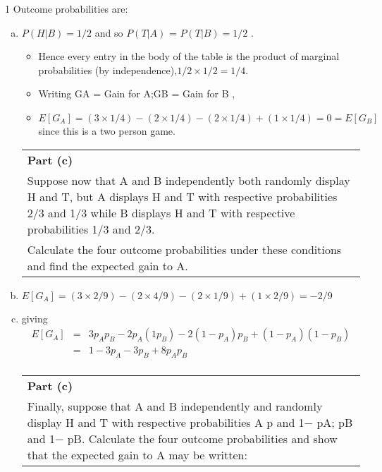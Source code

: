 \documentclass[a4paper,12pt]{article}
\begin{document}
1 Outcome probabilities are:
\begin{enumerate}[(a)]
 \item  $P(H|B) = 1/2$ and so $P(T|A)$ = $P(T|B) = 1/2$ .
\begin{itemize}
\item Hence every entry in the body of the table is the product of marginal probabilities (by
independence),$1/2 \times 1/2 = 1/4$.
\item Writing GA = Gain for A;GB = Gain for B ,
\item $E[G_A] = (3 \times 1/4) - (2 \times 1/4) - (2 \times 1/4) + (1 \times 1/4) = 0 = E[G_B]$
since this is a two person game.
\end{itemize}
\newpage
 
  \begin{table}[ht!]
  \centering
  \begin{tabular}{|p{15cm}|}
  \hline  
  \noindent \textbf{Part (c)} \\
Suppose now that A and B independently both randomly display H and T, but A displays H and T with respective probabilities 2/3 and 1/3 while B displays H and T with respective probabilities 1/3 and 2/3. \\ \smallskip

Calculate the four outcome probabilities under these conditions and find the expected gain to A. 
 \\ \hline 
   \end{tabular}
 \end{table}
 

\item $E[G_A] = (3 \times 2/9) - (2 \times 4/9) - (2 \times 1/9) + (1 \times 2/9) = -2/9$
\item giving 
\begin{eqnarray*}
E[G_A] &=& 3p_Ap_B - 2p_A(1  p_B) - 2(1 - p_A)p_B + (1 - p_A)(1 - p_B)\\ &=& 1 - 3p_A -
3p_B + 8p_Ap_B\\
\end{eqnarray*}
\newpage
\begin{table}[ht!]
 \centering
  \begin{tabular}{|p{15cm}|}
  \hline  
  \noindent \textbf{Part (c)} \\
Finally, suppose that A and B independently and randomly display H and T with respective probabilities A p and 1− pA;  pB and 1− pB.  Calculate the four outcome probabilities and show that the expected gain to A may be written: 
 

\end{tabular}
\end{table}
\end{enumerate}
\end{document}
